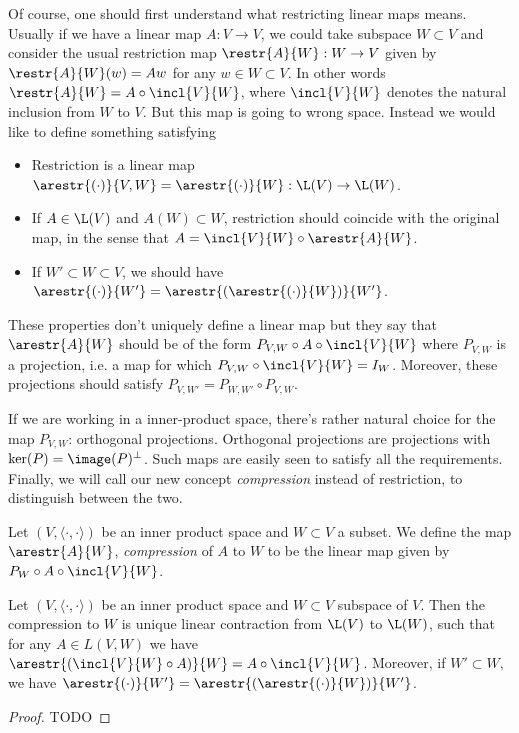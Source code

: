 Of course, one should first understand what restricting linear maps means. Usually if we have a linear map $A : V \to V$, we could take subspace $W \subset V$ and consider the usual restriction map $\restr{A}{W} : W \to V$ given by $\restr{A}{W}(w) = Aw$ for any $w \in W \subset V$. In other words $\restr{A}{W} = A \circ \incl{V}{W}$, where $\incl{V}{W}$ denotes the natural inclusion from $W$ to $V$. But this map is going to wrong space. Instead we would like to define something satisfying
\begin{itemize}
	\item Restriction is a linear map $\arestr{(\cdot)}{V, W} = \arestr{(\cdot)}{W} : \L(V) \to \L(W)$.
	\item If $A \in \L(V)$ and $A(W) \subset W$, restriction should coincide with the original map, in the sense that $A = \incl{V}{W} \circ \arestr{A}{W}$.
	\item If $W' \subset W \subset V$, we should have $\arestr{(\cdot)}{W'} = \arestr{(\arestr{(\cdot)}{W})}{W'}$.
\end{itemize}

These properties don't uniquely define a linear map but they say that $\arestr{A}{W}$ should be of the form $P_{V, W} \circ A \circ \incl{V}{W}$ where $P_{V, W}$ is a projection, i.e. a map for which $P_{V, W} \circ \incl{V}{W} = I_{W}$. Moreover, these projections should satisfy $P_{V, W'} = P_{W, W'} \circ P_{V, W}$.

If we are working in a inner-product space, there's rather natural choice for the map $P_{V, W}$: orthogonal projections. Orthogonal projections are projections with $\ker(P) = \image(P)^{\perp}$. Such maps are easily seen to satisfy all the requirements. Finally, we will call our new concept \textit{compression} instead of restriction, to distinguish between the two.

\begin{maar}
	Let $(V, \langle \cdot, \cdot \rangle )$ be an inner product space and $W \subset V$ a subset. We define the map $\arestr{A}{W}$, \textit{compression} of $A$ to $W$ to be the linear map given by $P_{W} \circ A \circ \incl{V}{W}$.
\end{maar}

\begin{lause}
	Let $(V, \langle \cdot, \cdot \rangle)$ be an inner product space and $W \subset V$ subspace of $V$. Then the compression to $W$ is unique linear contraction from $\L(V)$ to $\L(W)$, such that for any $A \in L(V, W)$ we have $\arestr{(\incl{V}{W} \circ A)}{W} = A \circ \incl{V}{W}$. Moreover, if $W' \subset W$, we have $\arestr{(\cdot)}{W'} = \arestr{(\arestr{(\cdot)}{W})}{W'}$.
\end{lause}
\begin{proof}
	TODO
\end{proof}

